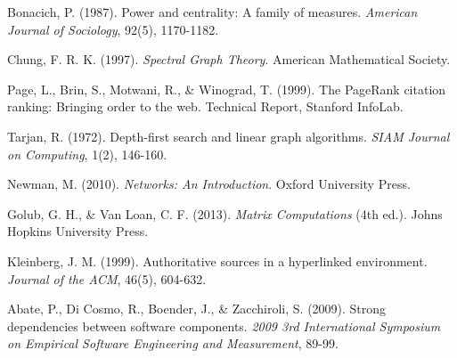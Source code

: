 \documentclass[11pt,a4paper]{article}
\begin{document}
\begin{thebibliography}{99}

Bonacich, P. (1987). Power and centrality: A family of measures. \textit{American Journal of Sociology}, 92(5), 1170-1182.

Chung, F. R. K. (1997). \textit{Spectral Graph Theory}. American Mathematical Society.

Page, L., Brin, S., Motwani, R., \& Winograd, T. (1999). The PageRank citation ranking: Bringing order to the web. Technical Report, Stanford InfoLab.

Tarjan, R. (1972). Depth-first search and linear graph algorithms. \textit{SIAM Journal on Computing}, 1(2), 146-160.

Newman, M. (2010). \textit{Networks: An Introduction}. Oxford University Press.

Golub, G. H., \& Van Loan, C. F. (2013). \textit{Matrix Computations} (4th ed.). Johns Hopkins University Press.

Kleinberg, J. M. (1999). Authoritative sources in a hyperlinked environment. \textit{Journal of the ACM}, 46(5), 604-632.

Abate, P., Di Cosmo, R., Boender, J., \& Zacchiroli, S. (2009). Strong dependencies between software components. \textit{2009 3rd International Symposium on Empirical Software Engineering and Measurement}, 89-99.

\end{thebibliography}
\end{document}
